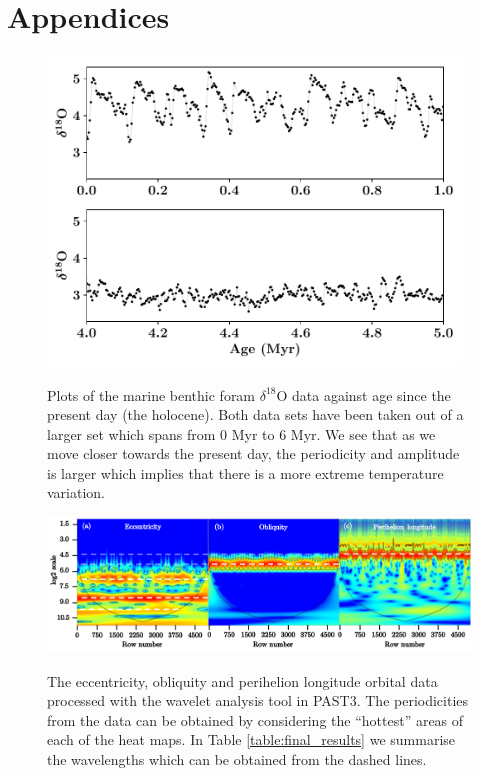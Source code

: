 \documentclass[12pt, onecolumn]{revtex4}    %
\begin{document}
\section*{Appendices}
\begin{figure}[!h]
\begin{center}
\includegraphics[width=11cm]{figures/foram_data}
\caption[]{Plots of the marine benthic foram $\delta^{18}$O data against age since the present day (the holocene). Both data sets have been taken out of a larger set which spans from 0 Myr to 6 Myr. We see that as we move closer towards the present day, the periodicity and amplitude is larger which implies that there is a more extreme temperature variation.}
\vspace{-3ex}
\label{fig:foram_data}
\end{center}
\end{figure}

\begin{figure}[!h]
\begin{center}
\includegraphics[width=16cm]{figures/wa_orbital_data}
\caption[]{The eccentricity, obliquity and perihelion longitude orbital data processed with the wavelet analysis tool in PAST3. The periodicities from the data can be obtained by considering the ``hottest'' areas of each of the heat maps. In Table \ref{table:final_results} we summarise the wavelengths which can be obtained from the dashed lines.}
\vspace{-3ex}
\label{fig:wa_orbital_data}
\end{center}
\end{figure}
\end{document}
